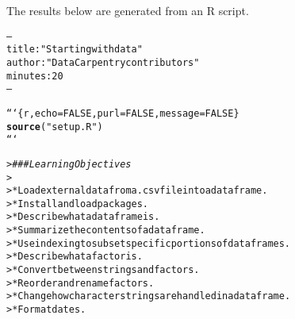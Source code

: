 \documentclass{article}\usepackage[]{graphicx}\usepackage[]{xcolor}
\makeatletter
\newcommand{\hlstr}[1]{\textcolor[rgb]{0.192,0.494,0.8}{#1}}%
\newcommand{\hlcom}[1]{\textcolor[rgb]{0.678,0.584,0.686}{\textit{#1}}}%
\newcommand{\hlkwd}[1]{\textcolor[rgb]{0.737,0.353,0.396}{\textbf{#1}}}%
\newenvironment{kframe}{%
 \def\at@end@of@kframe{}%
 \ifinner\ifhmode%
  \def\at@end@of@kframe{\end{minipage}}%
  \begin{minipage}{\columnwidth}%
 \fi\fi%
 \def\FrameCommand##1{\hskip\@totalleftmargin \hskip-\fboxsep
 \colorbox{shadecolor}{##1}\hskip-\fboxsep
     \hskip-\linewidth \hskip-\@totalleftmargin \hskip\columnwidth}%
 \MakeFramed {\advance\hsize-\width
   \@totalleftmargin\z@ \linewidth\hsize
   \@setminipage}}%
 {\par\unskip\endMakeFramed%
 \at@end@of@kframe}
\newenvironment{knitrout}{}{} %
\makeatother
\begin{document}
\title{\title{\title{}}}



\maketitle
The results below are generated from an R script.

\begin{knitrout}
\color{fgcolor}\begin{kframe}
\begin{alltt}
---
title: \hlstr{"Starting with data"}
author: \hlstr{"Data Carpentry contributors"}
minutes: 20
---

```\{r, echo=FALSE, purl=FALSE, message = FALSE\}
\hlkwd{source}(\hlstr{"setup.R"})
```
\end{alltt}


{\ttfamily\noindent\bfseries\color{errorcolor}{\#\# Error: attempt to use zero-length variable name}}\end{kframe}
\end{knitrout}
\begin{knitrout}
\color{fgcolor}\begin{kframe}
\begin{alltt}

> \hlcom{### Learning Objectives}
>
> * Load external data from a .csv file into a data frame.
> * Install and load packages.
> * Describe what a data frame is.
> * Summarize the contents of a data frame.
> * Use indexing to subset specific portions of data frames. 
> * Describe what a factor is.
> * Convert between strings and factors.
> * Reorder and rename factors.
> * Change how character strings are handled in a data frame.
> * Format dates.
\end{alltt}


{\ttfamily\noindent\bfseries{}}\end{kframe}
\end{knitrout}
\end{document}
